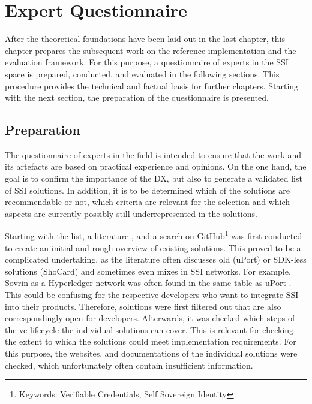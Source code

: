 
\chapter{Expert Questionnaire}\label{chapter: expert}
    
    After the theoretical foundations have been laid out in the last chapter, this chapter prepares the subsequent work on the reference implementation and the evaluation framework. For this purpose, a questionnaire of experts in the \ac{SSI} space is prepared, conducted, and evaluated in the following sections. This procedure provides the technical and factual basis for further chapters. Starting with the next section, the preparation of the questionnaire is presented.
   
    \section{Preparation}
    
    The questionnaire of experts in the field is intended to ensure that the work and its artefacts are based on practical experience and opinions. On the one hand, the goal is to confirm the importance of the \ac{DX}, but also to generate a validated list of \ac{SSI} solutions. In addition, it is to be determined which of the solutions are recommendable or not, which criteria are relevant for the selection and which aspects are currently possibly still underrepresented in the solutions.
    
    Starting with the list, a literature \cite{bouras_distributed_2020, bernabe_privacy-preserving_2019, dib_decentralized_2020, dunphy_first_2018, ferdous_search_2019, kuperberg_blockchain-based_2020, van_bokkem_self-sovereign_2019, friedewald_self-sovereign_2020,gruner_relevance_2018}, and a search on GitHub\footnote{Keywords: Verifiable Credentials, Self Sovereign Identity} was first conducted to create an initial and rough overview of existing solutions. This proved to be a complicated undertaking, as the literature often discusses old (uPort) or SDK-less solutions (ShoCard) and sometimes even mixes in \ac{SSI} networks. For example, Sovrin as a Hyperledger network was often found in the same table as uPort \cite{bouras_distributed_2020, bernabe_privacy-preserving_2019, dib_decentralized_2020, dunphy_first_2018}. This could be confusing for the respective developers who want to integrate \ac{SSI} into their products. Therefore, solutions were first filtered out that are also correspondingly open for developers. Afterwards, it was checked which steps of the \ac{vc} lifecycle \cite{sporny_verifiable_2019} the individual solutions can cover. This is relevant for checking the extent to which the solutions could meet implementation requirements. For this purpose, the websites, and documentations of the individual solutions were checked, which unfortunately often contain insufficient information.
    
